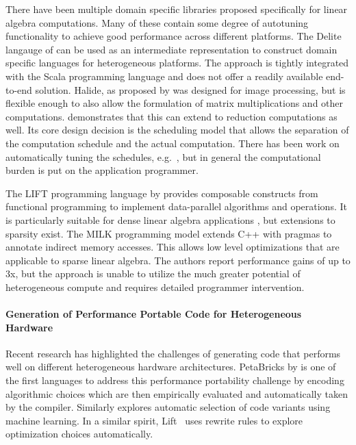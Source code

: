     There have been multiple domain specific libraries proposed specifically
    for linear algebra computations.
    Many of these contain some degree of autotuning functionality to achieve
    good performance across different platforms.
    The Delite langauge of \citet{Sujeeth:2014:DCA:2601432.2584665} can be used
    as an intermediate representation to construct domain specific languages for
    heterogeneous platforms.
    The approach is tightly integrated with the Scala programming language
    and does not offer a readily available end-to-end solution.
    Halide, as proposed by \citet{Ragan-Kelley:2013:HLC:2499370.2462176}
    was designed for image processing, but is flexible enough to also allow the 
    formulation of matrix multiplications and other computations.
    \citet{Suriana:2017:PAR:3049832.3049863} demonstrates that this can extend
    to reduction computations as well.
    Its core design decision is the scheduling model that allows the separation
    of the computation schedule and the actual computation.
    There has been work on automatically tuning the schedules, e.g.\ 
    \citet{Mullapudi:2016:ASH:2897824.2925952}, but in general the computational
    burden is put on the application programmer.

    The LIFT programming language by \citet{Steuwer:2015:GPP:2858949.2784754}
    provides composable constructs from functional programming to implement
    data-parallel algorithms and operations.
    It is particularly suitable for dense linear algebra applications
    \citep{Steuwer:2016:MMB:2968455.2968521}, but extensions to sparsity exist.
    The MILK programming model \citep{Kiriansky:2016:OIM:2967938.2967948}
    extends C++ with pragmas to annotate indirect memory accesses.
    This allows low level optimizations that are applicable to sparse linear
    algebra.
    The authors report performance gains of up to 3x, but the approach is unable
    to utilize the much greater potential of heterogeneous compute and requires
    detailed programmer intervention.

\paragraph*{Generation of Performance Portable Code for Heterogeneous Hardware}
    Recent research has highlighted the challenges of generating code that
    performs well on different heterogeneous hardware architectures.
    PetaBricks by \citet{PhothilimthanaARA13} is one of the first languages to
    address this performance portability challenge by encoding algorithmic
    choices which are then empirically evaluated and automatically taken by the
    compiler.
    Similarly \cite{MuralidharanRHG16} explores automatic selection of code
    variants using machine learning.
    In a similar spirit, Lift~\cite{steuwer15rewrite} uses rewrite rules to
    explore optimization choices automatically.

